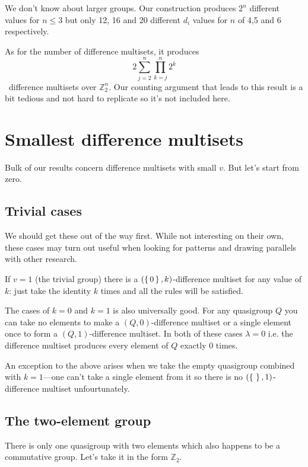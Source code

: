         We don't know about larger groups. Our construction produces $2^n$ different values for $n \leq 3$ but only 12, 16 and 20 different $d_i$ values for $n$ of 4,5 and 6 respectively.
        
        As for the number of difference multisets, it produces
        \begin{equation}
            2\sum\limits_{j=2}^n \prod\limits_{k=j}^n 2^k
        \end{equation}\
        difference multisets over $\mathbb Z_2^n$. Our counting argument that leads to this result is a bit tedious and not hard to replicate so it's not included here.
        
    
    
    
    
    
    
    
    
    
\section{Smallest difference multisets}
Bulk of our results concern difference multisets with small $v$. But let's start from zero.

\subsection{Trivial cases}
    We should get these out of the way first. While not interesting on their own, these cases may turn out useful when looking for patterns and drawing parallels with other research.
    
    If $v=1$ (the trivial group) there is a $(\set{0},k)$-difference multiset for any value of $k$: just take the identity $k$ times and all the rules will be satisfied.
    
    The cases of $k=0$ and $k=1$ is also universally good. For any quasigroup $Q$ you can take no elements to make a $(Q,0)$-difference multiset or a single element once to form a $(Q,1)$-difference multiset. In both of these cases $\lambda=0$ i.e. the difference multiset produces every element of $Q$ exactly $0$ times.
    
    An exception to the above arises when we take the empty quasigroup combined with $k=1$---one can't take a single element from it so there is no $(\set{}, 1)$-difference multiset unfourtunately.
    
\subsection{The two-element group}
    There is only one quasigroup with two elements which also happens to be a commutative group. Let's take it in the form $\mathbb Z_2$.

